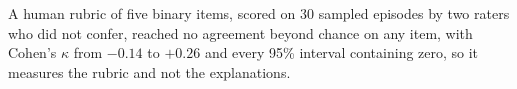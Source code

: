 A human rubric of five binary items, scored on 30 sampled episodes by two
raters who did not confer, reached no agreement beyond chance on any item,
with Cohen's $\kappa$ from $-0.14$ to $+0.26$ and every 95\% interval
containing zero, so it measures the rubric and not the explanations.
